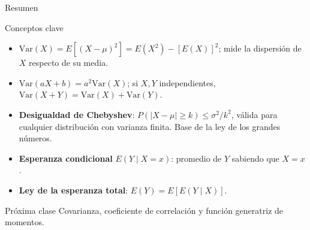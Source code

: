 \documentclass[aspectratio=169,11pt]{beamer}
\begin{document}
\begin{frame}{Resumen}
\begin{block}{Conceptos clave}
\begin{itemize}
\item $\text{Var}(X) = E[(X-\mu)^2] = E(X^2) - [E(X)]^2$; mide la dispersión de $X$ respecto de su media.
\item $\text{Var}(aX+b) = a^2\text{Var}(X)$; si $X,Y$ independientes, $\text{Var}(X+Y)=\text{Var}(X)+\text{Var}(Y)$.
\item \textbf{Desigualdad de Chebyshev}: $P(|X-\mu|\geq k) \leq \sigma^2/k^2$, válida para cualquier distribución con varianza finita. Base de la ley de los grandes números.
\item \textbf{Esperanza condicional} $E(Y\mid X=x)$: promedio de $Y$ sabiendo que $X=x$.
\item \textbf{Ley de la esperanza total}: $E(Y) = E[E(Y\mid X)]$.
\end{itemize}
\end{block}

\begin{alertblock}{Próxima clase}
Covarianza, coeficiente de correlación y función generatriz de momentos.
\end{alertblock}
\end{frame}
\end{document}
